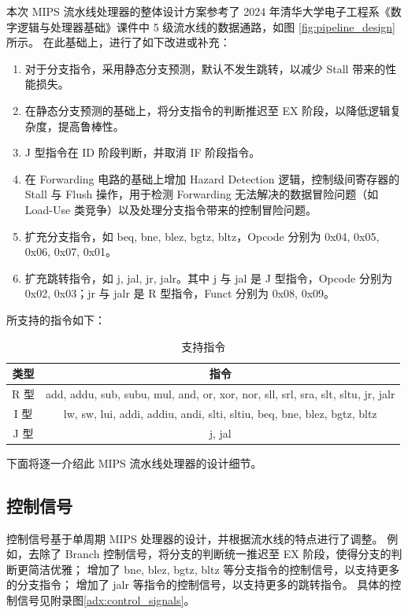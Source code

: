 \documentclass[a4paper]{article}  %
\begin{document}
本次 MIPS 流水线处理器的整体设计方案参考了 2024 年清华大学电子工程系《数字逻辑与处理器基础》课件中 5 级流水线的数据通路，如图 \ref{fig:pipeline_design} 所示。
在此基础上，进行了如下改进或补充：

\begin{enumerate}[1]
    \item 对于分支指令，采用静态分支预测，默认不发生跳转，以减少 Stall 带来的性能损失。
    \item 在静态分支预测的基础上，将分支指令的判断推迟至 EX 阶段，以降低逻辑复杂度，提高鲁棒性。
    \item J 型指令在 ID 阶段判断，并取消 IF 阶段指令。
    \item 在 Forwarding 电路的基础上增加 Hazard Detection 逻辑，控制级间寄存器的 Stall 与 Flush 操作，用于检测 Forwarding 无法解决的数据冒险问题（如 Load-Use 类竞争）以及处理分支指令带来的控制冒险问题。
    \item 扩充分支指令，如 beq, bne, blez, bgtz, bltz，Opcode 分别为 0x04, 0x05, 0x06, 0x07, 0x01。
    \item 扩充跳转指令，如 j, jal, jr, jalr。其中 j 与 jal 是 J 型指令，Opcode 分别为 0x02, 0x03；jr 与 jalr 是 R 型指令，Funct 分别为 0x08, 0x09。
\end{enumerate}

所支持的指令如下：

\begin{table}[htb]
    \centering
    \caption{
        支持指令
    }\label{tab:instructions}
    \begin{tabular}{cc}
        \toprule
        \textbf{类型} & \textbf{指令} \\
        \midrule
        R 型 & add, addu, sub, subu, mul, and, or, xor, nor, sll, srl, sra, slt, sltu, jr, jalr \\
        I 型 & lw, sw, lui, addi, addiu, andi, slti, sltiu, beq, bne, blez, bgtz, bltz \\
        J 型 & j, jal \\
        \bottomrule
    \end{tabular}
\end{table}
下面将逐一介绍此 MIPS 流水线处理器的设计细节。

\subsection{控制信号}

控制信号基于单周期 MIPS 处理器的设计，并根据流水线的特点进行了调整。
例如，去除了 Branch 控制信号，将分支的判断统一推迟至 EX 阶段，使得分支的判断更简洁优雅；
增加了 bne, blez, bgtz, bltz 等分支指令的控制信号，以支持更多的分支指令；
增加了 jalr 等指令的控制信号，以支持更多的跳转指令。
具体的控制信号见附录图\ref{adx:control_signals}。
\end{document}
